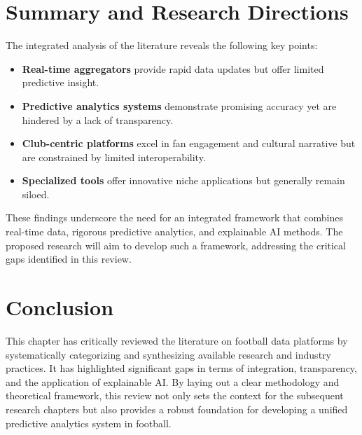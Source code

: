 \section{Summary and Research Directions}
The integrated analysis of the literature reveals the following key points:
\begin{itemize}
    \item \textbf{Real-time aggregators} provide rapid data updates but offer limited predictive insight.
    \item \textbf{Predictive analytics systems} demonstrate promising accuracy yet are hindered by a lack of transparency.
    \item \textbf{Club-centric platforms} excel in fan engagement and cultural narrative but are constrained by limited interoperability.
    \item \textbf{Specialized tools} offer innovative niche applications but generally remain siloed.
\end{itemize}
These findings underscore the need for an integrated framework that combines real-time data, rigorous predictive analytics, and explainable AI methods. The proposed research will aim to develop such a framework, addressing the critical gaps identified in this review.

\section{Conclusion}
This chapter has critically reviewed the literature on football data platforms by systematically categorizing and synthesizing available research and industry practices. It has highlighted significant gaps in terms of integration, transparency, and the application of explainable AI. By laying out a clear methodology and theoretical framework, this review not only sets the context for the subsequent research chapters but also provides a robust foundation for developing a unified predictive analytics system in football.

